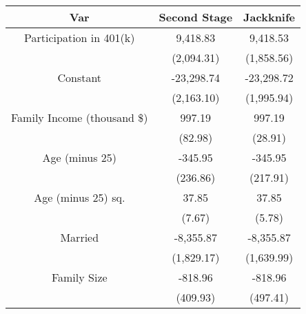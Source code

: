 
\begin{tabular}{ccc}
\toprule
Var & Second Stage & Jackknife\\
\midrule
Participation in 401(k) & 9,418.83 & 9,418.53\\
 & (2,094.31) & (1,858.56)\\
Constant & -23,298.74 & -23,298.72\\
 & (2,163.10) & (1,995.94)\\
Family Income (thousand \$) & 997.19 & 997.19\\
 & (82.98) & (28.91)\\
Age (minus 25) & -345.95 & -345.95\\
 & (236.86) & (217.91)\\
Age (minus 25) sq. & 37.85 & 37.85\\
 & (7.67) & (5.78)\\
Married & -8,355.87 & -8,355.87\\
 & (1,829.17) & (1,639.99)\\
Family Size & -818.96 & -818.96\\
 & (409.93) & (497.41)\\
\bottomrule
\end{tabular}
